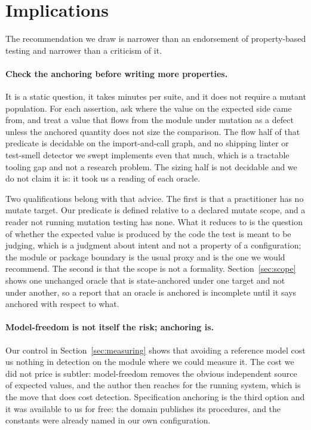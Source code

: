 \documentclass[12pt]{article}
\begin{document}
\section{Implications}
\label{sec:implications}

The recommendation we draw is narrower than an endorsement of property-based
testing and narrower than a criticism of it.

\paragraph{Check the anchoring before writing more properties.} It is a static
question, it takes minutes per suite, and it does not require a mutant
population. For each assertion, ask where the value on the expected side came
from, and treat a value that flows from the module under mutation as a defect
unless the anchored quantity does not size the comparison. The flow half of that
predicate is decidable on the import-and-call graph, and no shipping linter or
test-smell detector we swept implements even that much, which is a tractable tooling gap and not a research problem. The sizing half is not decidable and we do not
claim it is: it took us a reading of each oracle.

Two qualifications belong with that advice. The first is that a practitioner has
no mutate target. Our predicate is defined relative to a declared mutate scope,
and a reader not running mutation testing has none. What it reduces to is the
question of whether the expected value is produced by the code the test is meant
to be judging, which is a judgment about intent and not a property of a configuration; the module or package boundary is the usual proxy and is the one we
would recommend. The second is that the scope is not a formality.
Section~\ref{sec:scope} shows one unchanged oracle that is state-anchored under one
target and not under another, so a report that an oracle is anchored is incomplete
until it says anchored with respect to what.

\paragraph{Model-freedom is not itself the risk; anchoring is.} Our control in
Section~\ref{sec:measuring} shows that avoiding a reference model cost us nothing in
detection on the module where we could measure it. The cost we did not price is
subtler: model-freedom removes the obvious independent source of expected values,
and the author then reaches for the running system, which is the move that does cost
detection. Specification anchoring is the third option and it was available to us
for free: the domain publishes its procedures, and the constants were already named
in our own configuration.
\end{document}
